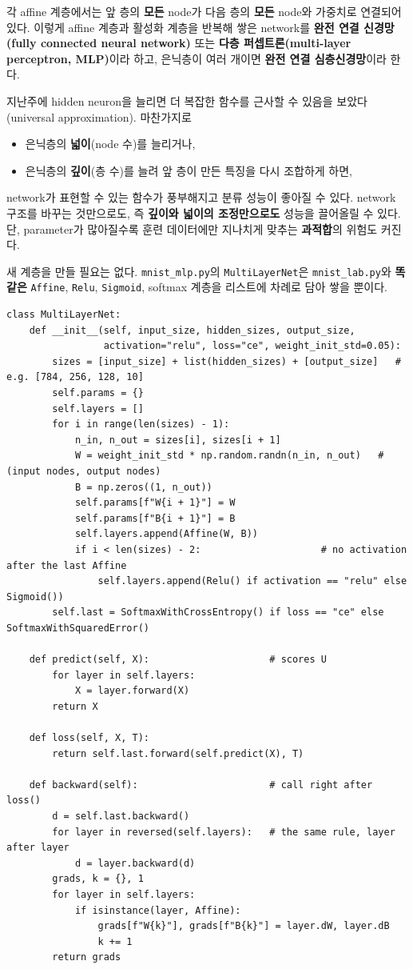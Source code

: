 \documentclass[11pt,a4paper]{article}
\begin{document}
각 affine 계층에서는 앞 층의 \textbf{모든} node가 다음 층의 \textbf{모든} node와 가중치로 연결되어 있다.
이렇게 affine 계층과 활성화 계층을 반복해 쌓은 network를
\textbf{완전 연결 신경망(fully connected neural network)} 또는 \textbf{다층 퍼셉트론(multi-layer perceptron, MLP)}이라 하고,
은닉층이 여러 개이면 \textbf{완전 연결 심층신경망}이라 한다.

\begin{keybox}
지난주에 hidden neuron을 늘리면 더 복잡한 함수를 근사할 수 있음을 보았다 (universal approximation).
마찬가지로
\begin{itemize}[leftmargin=1.8em]
\item 은닉층의 \textbf{넓이}(node 수)를 늘리거나,
\item 은닉층의 \textbf{깊이}(층 수)를 늘려 앞 층이 만든 특징을 다시 조합하게 하면,
\end{itemize}
network가 표현할 수 있는 함수가 풍부해지고 분류 성능이 좋아질 수 있다.
network 구조를 바꾸는 것만으로도, 즉 \textbf{깊이와 넓이의 조정만으로도} 성능을 끌어올릴 수 있다.
단, parameter가 많아질수록 훈련 데이터에만 지나치게 맞추는 \textbf{과적합}의 위험도 커진다.
\end{keybox}

새 계층을 만들 필요는 없다. \texttt{mnist\_mlp.py}의 \texttt{MultiLayerNet}은
\texttt{mnist\_lab.py}와 \textbf{똑같은} \texttt{Affine}, \texttt{Relu}, \texttt{Sigmoid}, softmax 계층을
리스트에 차례로 담아 쌓을 뿐이다.

\begin{lstlisting}
class MultiLayerNet:
    def __init__(self, input_size, hidden_sizes, output_size,
                 activation="relu", loss="ce", weight_init_std=0.05):
        sizes = [input_size] + list(hidden_sizes) + [output_size]   # e.g. [784, 256, 128, 10]
        self.params = {}
        self.layers = []
        for i in range(len(sizes) - 1):
            n_in, n_out = sizes[i], sizes[i + 1]
            W = weight_init_std * np.random.randn(n_in, n_out)   # (input nodes, output nodes)
            B = np.zeros((1, n_out))
            self.params[f"W{i + 1}"] = W
            self.params[f"B{i + 1}"] = B
            self.layers.append(Affine(W, B))
            if i < len(sizes) - 2:                     # no activation after the last Affine
                self.layers.append(Relu() if activation == "relu" else Sigmoid())
        self.last = SoftmaxWithCrossEntropy() if loss == "ce" else SoftmaxWithSquaredError()

    def predict(self, X):                     # scores U
        for layer in self.layers:
            X = layer.forward(X)
        return X

    def loss(self, X, T):
        return self.last.forward(self.predict(X), T)

    def backward(self):                       # call right after loss()
        d = self.last.backward()
        for layer in reversed(self.layers):   # the same rule, layer after layer
            d = layer.backward(d)
        grads, k = {}, 1
        for layer in self.layers:
            if isinstance(layer, Affine):
                grads[f"W{k}"], grads[f"B{k}"] = layer.dW, layer.dB
                k += 1
        return grads
\end{lstlisting}
\end{document}
